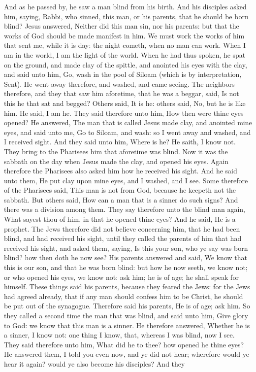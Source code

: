 And as he passed by, he saw a man blind from his birth. And his disciples asked him, saying, Rabbi, who sinned, this man, or his parents, that he should be born blind? Jesus answered, Neither did this man sin, nor his parents: but that the works of God should be made manifest in him. We must work the works of him that sent me, while it is day: the night cometh, when no man can work. When I am in the world, I am the light of the world. When he had thus spoken, he spat on the ground, and made clay of the spittle, and anointed his eyes with the clay, and said unto him, Go, wash in the pool of Siloam (which is by interpretation, Sent). He went away therefore, and washed, and came seeing. The neighbors therefore, and they that saw him aforetime, that he was a beggar, said, Is not this he that sat and begged? Others said, It is he: others said, No, but he is like him. He said, I am he. They said therefore unto him, How then were thine eyes opened? He answered, The man that is called Jesus made clay, and anointed mine eyes, and said unto me, Go to Siloam, and wash: so I went away and washed, and I received sight. And they said unto him, Where is he? He saith, I know not.  They bring to the Pharisees him that aforetime was blind. Now it was the sabbath on the day when Jesus made the clay, and opened his eyes. Again therefore the Pharisees also asked him how he received his sight. And he said unto them, He put clay upon mine eyes, and I washed, and I see. Some therefore of the Pharisees said, This man is not from God, because he keepeth not the sabbath. But others said, How can a man that is a sinner do such signs? And there was a division among them. They say therefore unto the blind man again, What sayest thou of him, in that he opened thine eyes? And he said, He is a prophet. The Jews therefore did not believe concerning him, that he had been blind, and had received his sight, until they called the parents of him that had received his sight, and asked them, saying, Is this your son, who ye say was born blind? how then doth he now see? His parents answered and said, We know that this is our son, and that he was born blind: but how he now seeth, we know not; or who opened his eyes, we know not: ask him; he is of age; he shall speak for himself. These things said his parents, because they feared the Jews: for the Jews had agreed already, that if any man should confess him to be Christ, he should be put out of the synagogue. Therefore said his parents, He is of age; ask him. So they called a second time the man that was blind, and said unto him, Give glory to God: we know that this man is a sinner. He therefore answered, Whether he is a sinner, I know not: one thing I know, that, whereas I was blind, now I see. They said therefore unto him, What did he to thee? how opened he thine eyes? He answered them, I told you even now, and ye did not hear; wherefore would ye hear it again? would ye also become his disciples? And they 